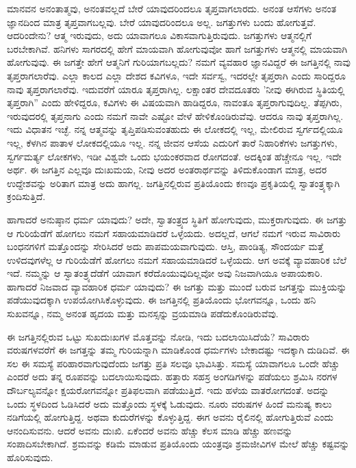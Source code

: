 ಮಾನವನ ಅನಂತಾತ್ಮವು, ಅನಂತವಲ್ಲದೆ ಬೇರೆ ಯಾವುದರಿಂದಲೂ ತೃಪ್ತವಾಗಲಾರದು. ಅನಂತ ಆಸೆಗಳು ಅನಂತ ಜ್ಞಾನದಿಂದ ಮಾತ್ರ ತೃಪ್ತವಾಗಬಲ್ಲವು. ಬೇರೆ ಯಾವುದರಿಂದಲೂ ಅಲ್ಲ. ಜಗತ್ತುಗಳು ಬಂದು ಹೋಗುತ್ತವೆ. ಆದರಿಂದೇನು? ಆತ್ಮ ಇರುವುದು, ಅದು ಯಾವಾಗಲೂ ವಿಕಾಸವಾಗುತ್ತಿರುವುದು. ಜಗತ್ತುಗಳು ಆತ್ಮನಲ್ಲಿಗೆ ಬರಬೇಕಾಗಿವೆ. ಹನಿಗಳು ಸಾಗರದಲ್ಲಿ ಹೇಗೆ ಮಾಯವಾಗಿ ಹೋಗುವುವೋ ಹಾಗೆ ಜಗತ್ತುಗಳು ಆತ್ಮನಲ್ಲಿ ಮಾಯವಾಗಿ ಹೋಗುವುವು. ಈ ಜಗತ್ತೇ ಹೇಗೆ ಆತ್ಮನಿಗೆ ಗುರಿಯಾಗಬಲ್ಲದು? ನಮಗೆ ವ್ಯವಹಾರ ಜ್ಞಾನವಿದ್ದರೆ ಈ ಜಗತ್ತಿನಲ್ಲಿ ನಾವು ತೃಪ್ತರಾಗಲಾರೆವು. ಎಲ್ಲಾ ಕಾಲದ ಎಲ್ಲಾ ದೇಶದ ಕವಿಗಳೂ, ಇದೇ ಸರ್ವಸ್ವ, ಇದರಲ್ಲೇ ತೃಪ್ತರಾಗಿ ಎಂದು ಸಾರಿದ್ದರೂ ನಾವು ತೃಪ್ತರಾಗಲಾರೆವು. ಇದುವರೆಗೆ ಯಾರೂ ತೃಪ್ತರಾಗಿಲ್ಲ. ಲಕ್ಷಾಂತರ ದೇವದೂತರು 'ನೀವು ಈಗಿರುವ ಸ್ಥಿತಿಯಲ್ಲಿ ತೃಪ್ತರಾಗಿ” ಎಂದು ಹೇಳಿದ್ದರೂ, ಕವಿಗಳು ಈ ವಿಷಯವಾಗಿ ಹಾಡಿದ್ದರೂ, ನಾವಂತೂ ತೃಪ್ತರಾಗುವುದಿಲ್ಲ. ತೆಪ್ಪಗಿರು, ಇರುವುದರಲ್ಲಿ ತೃಪ್ತನಾಗು ಎಂದು ನಮಗೆ ನಾವೇ ಎಷ್ಟೋ ವೇಳೆ ಹೇಳಿಕೊಂಡಿರುವೆವು. ಆದರೂ ನಾವು ತೃಪ್ತರಾಗಿಲ್ಲ. ಇದು ವಿಧಾತನ ಇಚ್ಛೆ. ನನ್ನ ಆತ್ಮವನ್ನು ತೃಪ್ತಿಪಡಿಸುವಂತಹುದು ಈ ಲೋಕದಲ್ಲಿ ಇಲ್ಲ, ಮೇಲಿರುವ ಸ್ವರ್ಗದಲ್ಲಿಯೂ ಇಲ್ಲ, ಕೆಳಗಿನ ಪಾತಾಳ ಲೋಕದಲ್ಲಿಯೂ ಇಲ್ಲ. ನನ್ನ ಜೀವನ ಆಸೆಯ ಎದುರಿಗೆ ತಾರೆ ನಿಹಾರಿಕೆಗಳು ಜಗತ್ತುಗಳು, ಸ್ವರ್ಗಮರ್ತ್ಯ ಲೋಕಗಳು, ಇಡೀ ವಿಶ್ವವೇ ಒಂದು ಭಯಂಕರವಾದ ರೋಗದಂತೆ. ಅದಕ್ಕಿಂತ ಹೆಚ್ಚೇನೂ ಇಲ್ಲ. ಇದೇ ಅರ್ಥ. ಈ ಜಗತ್ತಿನ ಎಲ್ಲವೂ ದುಃಖಮಯ, ನೀವು ಅದರ ಅಂತರಾರ್ಥವನ್ನು ತಿಳಿದುಕೊಂಡಾಗ ಮಾತ್ರ, ಅದರ ಉದ್ದೇಶವನ್ನು ಅರಿತಾಗ ಮಾತ್ರ ಅದು ಹಾಗಲ್ಲ. ಜಗತ್ತಿನಲ್ಲಿರುವ ಪ್ರತಿಯೊಂದು ಕಣವೂ ಪ್ರಕೃತಿಯಲ್ಲಿ ಸ್ವಾತಂತ್ರ್ಯಕ್ಕಾಗಿ ಕ್ರಂದಿಸುತ್ತಿದೆ.

ಹಾಗಾದರೆ ಅನುಷ್ಠಾನ ಧರ್ಮ ಯಾವುದು? ಅದೇ, ಸ್ವಾತಂತ್ರ್ಯದ ಸ್ಥಿತಿಗೆ ಹೋಗುವುದು, ಮುಕ್ತರಾಗುವುದು. ಈ ಜಗತ್ತು ಆ ಗುರಿಯೆಡೆಗೆ ಹೋಗಲು ನಮಗೆ ಸಹಾಯಮಾಡಿದರೆ ಒಳ್ಳೆಯದು. ಅದಲ್ಲದೆ, ಆಗಲೆ ನಮಗೆ ಇರುವ ಸಾವಿರಾರು ಬಂಧನಗಳಿಗೆ ಮತ್ತೊಂದನ್ನು ಸೇರಿಸಿದರೆ ಅದು ಪಾಪಮಯವಾಗುವುದು. ಆಸ್ತಿ, ಪಾಂಡಿತ್ಯ, ಸೌಂದರ್ಯ ಮತ್ತೆ ಉಳಿದವುಗಳೆಲ್ಲ ಆ ಗುರಿಯೆಡೆಗೆ ಹೋಗಲು ನಮಗೆ ಸಹಾಯಮಾಡಿದರೆ ಒಳ್ಳೆಯದು. ಆಗ ಅವಕ್ಕೆ ವ್ಯಾವಹಾರಿಕ ಬೆಲೆ ಇದೆ. ನಮ್ಮನ್ನು ಆ ಸ್ವಾತಂತ್ರ್ಯದೆಡೆಗೆ ಯಾವಾಗ ಕರೆದೊಯುವುದಿಲ್ಲವೋ ಅವು ನಿಜವಾಗಿಯೂ ಅಪಾಯಕಾರಿ. ಹಾಗಾದರೆ ನಿಜವಾದ ವ್ಯಾವಹಾರಿಕ ಧರ್ಮ ಯಾವುದು? ಈ ಜಗತ್ತು ಮತ್ತು ಮುಂದೆ ಬರುವ ಜಗತ್ತನ್ನು ಮುಕ್ತಿಯನ್ನು ಪಡೆಯುವುದಕ್ಕಾಗಿ ಉಪಯೋಗಿಸಿಕೊಳ್ಳುವುದು. ಈ ಜಗತ್ತಿನಲ್ಲಿ ಪ್ರತಿಯೊಂದು ಭೋಗವನ್ನೂ, ಒಂದು ಹನಿ ಸುಖವನ್ನೂ, ನಮ್ಮ ಅನಂತ ಹೃದಯ ಮತ್ತು ಮನಸ್ಸನ್ನು ವ್ರಯಮಾಡಿ ಪಡೆದುಕೊಂಡಿರುವೆವು.

ಈ ಜಗತ್ತಿನಲ್ಲಿರುವ ಒಟ್ಟು ಸುಖದುಃಖಗಳ ಮೊತ್ತವನ್ನು ನೋಡಿ, ಇದು ಬದಲಾಯಿಸಿದೆಯೆ? ಸಾವಿರಾರು ವರುಷಗಳವರೆಗೆ ಈ ಜಗತ್ತನ್ನು ತಮ್ಮ ಗುರಿಯನ್ನಾಗಿ ಮಾಡಿಕೊಂಡ ಧರ್ಮಗಳು ಬೇಕಾದಷ್ಟು ಇದಕ್ಕಾಗಿ ದುಡಿದಿವೆ. ಈ ಸಲ ಈ ಸಮಸ್ಯೆ ಪರಿಹಾರವಾಗುವುದೆಂದು ಜಗತ್ತು ಪ್ರತಿ ಸಲವೂ ಭಾವಿಸಿತ್ತು. ಸಮಸ್ಯೆ ಯಾವಾಗಲೂ ಒಂದೇ ಹೆಚ್ಚು ಎಂದರೆ ಅದು ತನ್ನ ರೂಪವನ್ನು ಬದಲಾಯಿಸುವುದು. ಹತ್ತಾರು ಸಹಸ್ರ ಅಂಗಡಿಗಳನ್ನು ಪಡೆಯಲು ಶ್ರಮಿಸಿ ನರಗಳ ದೌರ್ಬಲ್ಯವನ್ನೋ ಕ್ಷಯರೋಗವನ್ನೋ ಪ್ರತಿಫಲವಾಗಿ ಪಡೆಯುತ್ತಿದೆ. ಇದು ಹಳೆಯ ವಾತರೋಗದಂತೆ. ಅದನ್ನು ಒಂದು ಸ್ಥಳದಿಂದ ಓಡಿಸಿದರೆ ಅದು ಮತ್ತೊಂದು ಸ್ಥಳಕ್ಕೆ ಓಡುವುದು. ನೂರು ವರುಷಗಳ ಹಿಂದೆ ಮನುಷ್ಯ ಕಾಲು ನಡಿಗೆಯಲ್ಲಿ ಹೋಗುತ್ತಿದ್ದ. ಅಥವಾ ಕುದುರೆಗಳನ್ನು ಕೊಳ್ಳುತ್ತಿದ್ದ. ಈಗ ಅವನು ರೈಲಿನಲ್ಲಿ ಹೋಗುತ್ತಿರುವೆ ಎಂದು ಆನಂದಿಸುವನು. ಆದರೆ ಅವನು ದುಃಖಿ. ಏಕೆಂದರೆ ಅವನು ಹೆಚ್ಚು ಕೆಲಸ ಮಾಡಿ ಹೆಚ್ಚು ಹಣವನ್ನು ಸಂಪಾದಿಸಬೇಕಾಗಿದೆ. ಶ್ರಮವನ್ನು ಕಡಿಮೆ ಮಾಡುವ ಪ್ರತಿಯೊಂದು ಯಂತ್ರವೂ ಶ್ರಮಜೀವಿಗಳ ಮೇಲೆ ಹೆಚ್ಚು ಕಷ್ಟವನ್ನು ಹೊರಿಸುವುದು.

